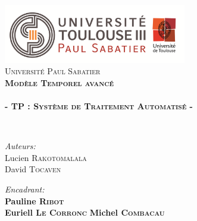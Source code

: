 
\begin{titlepage}
\begin{center}


\includegraphics[width=0.60\textwidth]{./page_de_garde/logo_ups.png}~\\[1cm]

\textsc{\LARGE Université Paul Sabatier}\\[1.5cm]

\textsc{\Large \bf Modèle Temporel avancé }\\[0.5cm]

\HRule \\[0.4cm]

{\huge \bfseries  - TP : \textsc{Système de Traitement Automatisé} -}

\HRule \\[1.5cm]

\begin{minipage}{0.4\textwidth}
\begin{flushleft} \large
\emph{Auteurs:}\\
Lucien \textsc{Rakotomalala}\\
David \textsc{Tocaven}\\
\end{flushleft}
\end{minipage}
\begin{minipage}{0.58\textwidth}
\begin{flushright} \large
\emph{Encadrant:} \\
\textbf{ Pauline \textsc{Ribot}}\\
\textbf{ Euriell \textsc{Le Corronc}}
\textbf{ Michel \textsc{Combacau}}
\end{flushright}
\end{minipage}
\newline
\newline
\vfill
~\\[1cm]


\end{center}
\end{titlepage}
